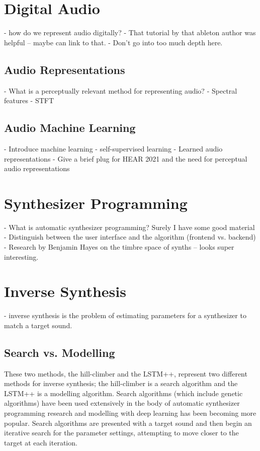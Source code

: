 \section{Digital Audio}
- how do we represent audio digitally?
- That tutorial by that ableton author was helpful -- maybe can link to that.
- Don't go into too much depth here.

\subsection{Audio Representations}
- What is a perceptually relevant method for representing audio?
- Spectral features
- STFT

\subsection{Audio Machine Learning}
- Introduce machine learning
- self-supervised learning
- Learned audio representations
- Give a brief plug for HEAR 2021 and the need for perceptual audio representations

\section{Synthesizer Programming}
- What is automatic synthesizer programming? Surely I have some good material
- Distinguish between the user interface and the algorithm (frontend vs. backend)
- Research by Benjamin Hayes on the timbre space of synths -- looks super interesting.

\section{Inverse Synthesis}
- inverse synthesis is the problem of estimating parameters for a synthesizer to match a target sound.
\subsection{Search vs. Modelling}

These two methods, the hill-climber and the LSTM++, represent two different methods for inverse synthesis; the hill-climber is a search algorithm and the LSTM++ is a modelling algorithm. Search algorithms (which include genetic algorithms) have been used extensively in the body of automatic synthesizer programming research and modelling with deep learning has been becoming more popular. Search algorithms are presented with a target sound and then begin an iterative search for the parameter settings, attempting to move closer to the target at each iteration.

